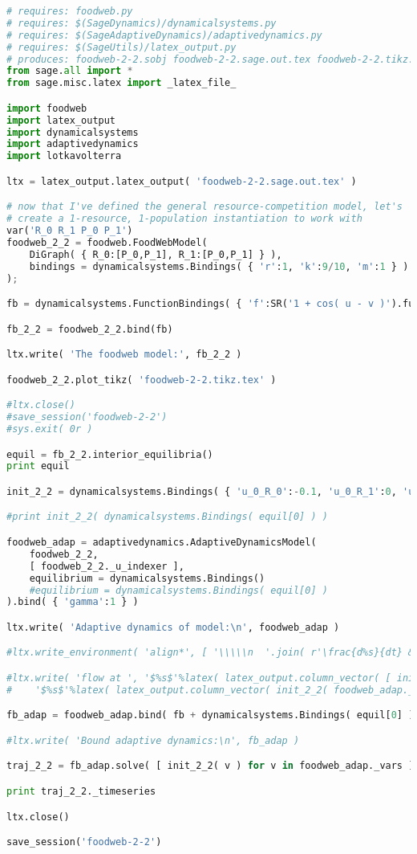 \begin{lstlisting}[language=Python]
# requires: foodweb.py
# requires: $(SageDynamics)/dynamicalsystems.py
# requires: $(SageAdaptiveDynamics)/adaptivedynamics.py
# requires: $(SageUtils)/latex_output.py
# produces: foodweb-2-2.sobj foodweb-2-2.sage.out.tex foodweb-2-2.tikz.tex
from sage.all import * 
from sage.misc.latex import _latex_file_

import foodweb
import latex_output
import dynamicalsystems
import adaptivedynamics
import lotkavolterra

ltx = latex_output.latex_output( 'foodweb-2-2.sage.out.tex' )

# now that I've defined the general resource-competition model, let's
# create a 1-resource, 1-population instantiation to work with
var('R_0 R_1 P_0 P_1')
foodweb_2_2 = foodweb.FoodWebModel(
    DiGraph( { R_0:[P_0,P_1], R_1:[P_0,P_1] } ),
    bindings = dynamicalsystems.Bindings( { 'r':1, 'k':9/10, 'm':1 } )
);

fb = dynamicalsystems.FunctionBindings( { 'f':SR('1 + cos( u - v )').function(SR('u'),SR('v')) } )

fb_2_2 = foodweb_2_2.bind(fb)

ltx.write( 'The foodweb model:', fb_2_2 )

foodweb_2_2.plot_tikz( 'foodweb-2-2.tikz.tex' )

#ltx.close()
#save_session('foodweb-2-2')
#sys.exit( 0r )

equil = fb_2_2.interior_equilibria()
print equil

init_2_2 = dynamicalsystems.Bindings( { 'u_0_R_0':-0.1, 'u_0_R_1':0, 'u_0_P_0':-0.07, 'u_0_P_1':0.02 } ) 

#print init_2_2( dynamicalsystems.Bindings( equil[0] ) )

foodweb_adap = adaptivedynamics.AdaptiveDynamicsModel( 
    foodweb_2_2,
    [ foodweb_2_2._u_indexer ],
    equilibrium = dynamicalsystems.Bindings()
    #equilibrium = dynamicalsystems.Bindings( equil[0] )
).bind( { 'gamma':1 } )

ltx.write( 'Adaptive dynamics of model:\n', foodweb_adap )

#ltx.write_environment( 'align*', [ '\\\\\n  '.join( r'\frac{d%s}{dt} &\propto %s' % (latex(v), latex(foodweb_adap._S[v])) for v in foodweb_adap._vars ) ] )

#ltx.write( 'flow at ', '$%s$'%latex( latex_output.column_vector( [ init_2_2( v ) for v in foodweb_adap._vars ] ) ), ': ',
#    '$%s$'%latex( latex_output.column_vector( init_2_2( foodweb_adap._flow[v] ) for v in foodweb_adap._vars ) ) )

fb_adap = foodweb_adap.bind( fb + dynamicalsystems.Bindings( equil[0] ) )

#ltx.write( 'Bound adaptive dynamics:\n', fb_adap )

traj_2_2 = fb_adap.solve( [ init_2_2( v ) for v in foodweb_adap._vars ], end_time=30 ) #, step=0.003 )

print traj_2_2._timeseries

ltx.close()

save_session('foodweb-2-2')
\end{lstlisting}
